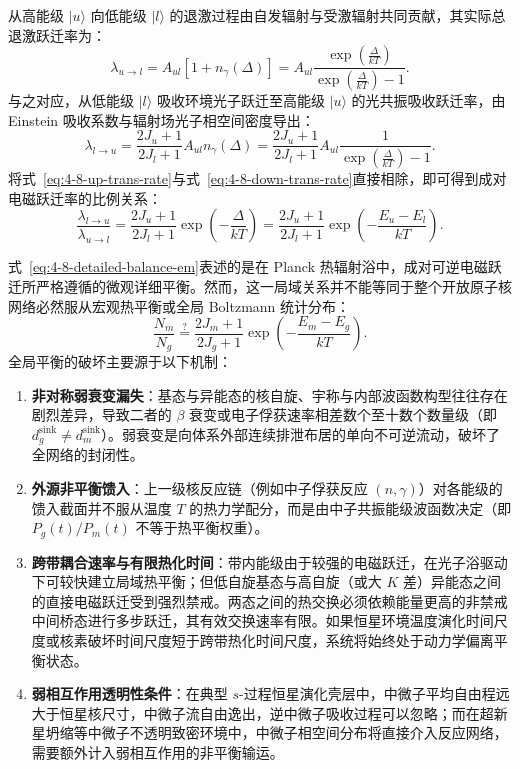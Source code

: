 从高能级 $|u\rangle$ 向低能级 $|l\rangle$ 的退激过程由自发辐射与受激辐射共同贡献，其实际总退激跃迁率为：
\begin{equation}\label{eq:4-8-down-trans-rate}
\lambda_{u \to l} = A_{ul} \left[ 1 + n_\gamma(\Delta) \right] = A_{ul} \frac{\exp\left(\frac{\Delta}{kT}\right)}{\exp\left(\frac{\Delta}{kT}\right) - 1}.
\end{equation}
与之对应，从低能级 $|l\rangle$ 吸收环境光子跃迁至高能级 $|u\rangle$ 的光共振吸收跃迁率，由 Einstein 吸收系数与辐射场光子相空间密度导出：
\begin{equation}\label{eq:4-8-up-trans-rate}
\lambda_{l \to u} = \frac{2J_u + 1}{2J_l + 1} A_{ul} n_\gamma(\Delta) = \frac{2J_u + 1}{2J_l + 1} A_{ul} \frac{1}{\exp\left(\frac{\Delta}{kT}\right) - 1}.
\end{equation}
将式~\eqref{eq:4-8-up-trans-rate}与式~\eqref{eq:4-8-down-trans-rate}直接相除，即可得到成对电磁跃迁率的比例关系：
\begin{equation}\label{eq:4-8-detailed-balance-em}
\frac{\lambda_{l \to u}}{\lambda_{u \to l}} = \frac{2J_u + 1}{2J_l + 1} \exp\left(-\frac{\Delta}{kT}\right) = \frac{2J_u + 1}{2J_l + 1} \exp\left(-\frac{E_u - E_l}{kT}\right).
\end{equation}

式~\eqref{eq:4-8-detailed-balance-em}表述的是在 Planck 热辐射浴中，成对可逆电磁跃迁所严格遵循的微观详细平衡。然而，这一局域关系并不能等同于整个开放原子核网络必然服从宏观热平衡或全局 Boltzmann 统计分布：
\begin{equation}\label{eq:4-8-boltzmann-naive}
\frac{N_m}{N_g} \stackrel{?}{=} \frac{2J_m + 1}{2J_g + 1} \exp\left(-\frac{E_m - E_g}{kT}\right).
\end{equation}
全局平衡的破坏主要源于以下机制：
\begin{enumerate}
\item \textbf{非对称弱衰变漏失}：基态与异能态的核自旋、宇称与内部波函数构型往往存在剧烈差异，导致二者的 $\beta$ 衰变或电子俘获速率相差数个至十数个数量级（即 $d_g^{\mathrm{sink}} \ne d_m^{\mathrm{sink}}$）。弱衰变是向体系外部连续排泄布居的单向不可逆流动，破坏了全网络的封闭性。
\item \textbf{外源非平衡馈入}：上一级核反应链（例如中子俘获反应 $(n,\gamma)$）对各能级的馈入截面并不服从温度 $T$ 的热力学配分，而是由中子共振能级波函数决定（即 $P_g(t) / P_m(t)$ 不等于热平衡权重）。
\item \textbf{跨带耦合速率与有限热化时间}：带内能级由于较强的电磁跃迁，在光子浴驱动下可较快建立局域热平衡；但低自旋基态与高自旋（或大 $K$ 差）异能态之间的直接电磁跃迁受到强烈禁戒。两态之间的热交换必须依赖能量更高的非禁戒中间桥态进行多步跃迁，其有效交换速率有限。如果恒星环境温度演化时间尺度或核素破坏时间尺度短于跨带热化时间尺度，系统将始终处于动力学偏离平衡状态。
\item \textbf{弱相互作用透明性条件}：在典型 $s$-过程恒星演化壳层中，中微子平均自由程远大于恒星核尺寸，中微子流自由逸出，逆中微子吸收过程可以忽略；而在超新星坍缩等中微子不透明致密环境中，中微子相空间分布将直接介入反应网络，需要额外计入弱相互作用的非平衡输运。
\end{enumerate}

